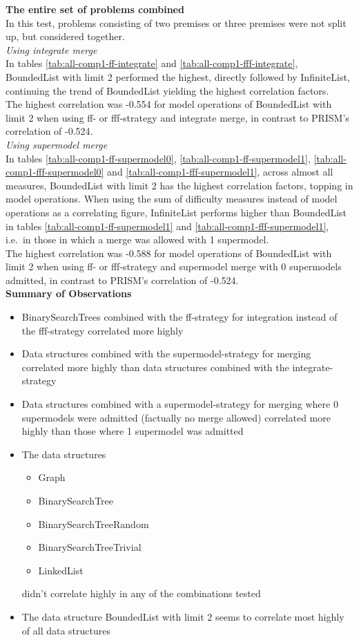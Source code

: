 \documentclass[hidelinks]{scrartcl}
\begin{document}
\textbf{The entire set of problems combined} \\
In this test, problems consisting of two \gls{premise}s or three \gls{premise}s were not split up, but considered together.\\

\textit{Using integrate merge} \\
In tables \ref{tab:all-comp1-ff-integrate} and \ref{tab:all-comp1-fff-integrate}, BoundedList with limit 2 performed the highest, directly followed by InfiniteList, continuing the trend of BoundedList yielding the highest correlation factors. \\
The highest correlation was -0.554 for model operations of BoundedList with limit 2 when using ff- or fff-strategy and integrate merge, in contrast to PRISM's correlation of -0.524. \\

\textit{Using supermodel merge} \\
In tables \ref{tab:all-comp1-ff-supermodel0}, \ref{tab:all-comp1-ff-supermodel1}, \ref{tab:all-comp1-fff-supermodel0} and \ref{tab:all-comp1-fff-supermodel1}, across almost all measures, BoundedList with limit 2 has the highest correlation factors, topping in model operations. When using the sum of difficulty measures instead of model operations as a correlating figure, InfiniteList performs higher than BoundedList in tables \ref{tab:all-comp1-ff-supermodel1} and \ref{tab:all-comp1-fff-supermodel1}, i.e.\ in those in which a merge was allowed with 1 supermodel. \\
The highest correlation was -0.588 for model operations of BoundedList with limit 2 when using ff- or fff-strategy and supermodel merge with 0 supermodels admitted, in contrast to PRISM's correlation of -0.524. \\

\textbf{Summary of Observations}
\begin{itemize}
\item BinarySearchTrees combined with the ff-strategy for integration instead of the fff-strategy correlated more highly
\item Data structures combined with the supermodel-strategy for merging correlated more highly than data structures combined with the integrate-strategy
\item Data structures combined with a supermodel-strategy for merging where 0 supermodels were admitted (factually no merge allowed) correlated more highly than those where 1 supermodel was admitted
\item The data structures 
	\begin{itemize}
	\item Graph
	\item BinarySearchTree
	\item BinarySearchTreeRandom
	\item BinarySearchTreeTrivial
	\item LinkedList
	\end{itemize}
didn't correlate highly in any of the combinations tested
\item The data structure BoundedList with limit 2 seems to correlate most highly of all data structures
\end{itemize}
\end{document}
